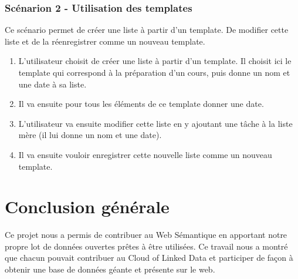 \documentclass[a4paper,10pt]{article}
\begin{document}
\subsubsection{Scénarion 2 - Utilisation des templates}
Ce scénario permet de créer une liste à partir d'un template. De modifier cette liste et de la réenregistrer comme un nouveau template.
\begin{enumerate}
\item{L'utilisateur choisit de créer une liste à partir d'un template. Il choisit ici le template qui correspond à la préparation d'un cours, puis donne un nom et une date à sa liste.}
\item{Il va ensuite pour tous les éléments de ce template donner une date.}
\item{L'utilisateur va ensuite modifier cette liste en y ajoutant une tâche à la liste mère (il lui donne un nom et une date).}
\item{Il va ensuite vouloir enregistrer cette nouvelle liste comme un nouveau template.}
\end{enumerate}


\newpage
\section{}


\newpage

\newpage
\section{Conclusion générale}
Ce projet nous a permis de contribuer au Web Sémantique en apportant notre propre lot de données ouvertes prêtes à être utilisées.
Ce travail nous a montré que chacun pouvait contribuer au Cloud of Linked Data et participer de façon à obtenir une base de données géante et présente sur le web.
\end{document}
